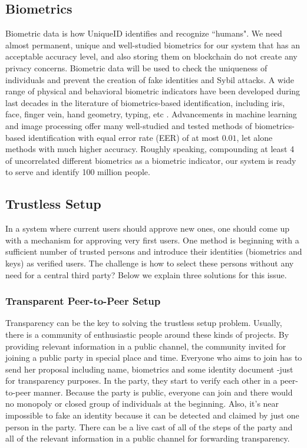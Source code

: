 \documentclass[conference]{IEEEtran}
\begin{document}
\subsection{Biometrics}
Biometric data is how UniqueID identifies and recognize ``humans". We need almost permanent, unique and well-studied biometrics for our system that has an acceptable accuracy level, and also storing them on blockchain do not create any privacy concerns.
Biometric data will be used to check the uniqueness of individuals and prevent the creation of fake identities and Sybil attacks. A wide range of physical and behavioral biometric indicators have been developed during last decades in the literature of biometrics-based identification, including iris, face, finger vein, hand geometry, typing, etc \cite{intro-biometic}. Advancements in machine learning and image processing offer many well-studied and tested methods of biometrics-based identification with equal error rate (EER) of at most $0.01$, let alone methods with much higher accuracy. Roughly speaking, compounding at least 4 of uncorrelated different biometrics as a biometric indicator, our system is ready to serve and identify 100 million people.

\subsection{Trustless Setup}
In a system where current users should approve new ones, one should come up with a mechanism for approving very first users. One method is beginning with a sufficient number of trusted persons and introduce their identities (biometrics and keys) as verified users. The challenge is how to select these persons without any need for a central third party? Below we explain three solutions for this issue.

\subsubsection*{Transparent Peer-to-Peer Setup} 
Transparency can be the key to solving the trustless setup problem. Usually, there is a community of enthusiastic people around these kinds of projects. By providing relevant information in a public channel, the community invited for joining a public party in special place and time. Everyone who aims to join has to send her proposal including name, biometrics and some identity document -just for transparency purposes. In the party, they start to verify each other in a peer-to-peer manner. Because the party is public, everyone can join and there would no monopoly or closed group of individuals at the beginning. Also, it's near impossible to fake an identity because it can be detected and claimed by just one person in the party. There can be a live cast of all of the steps of the party and all of the relevant information in a public channel for forwarding transparency.
\end{document}
